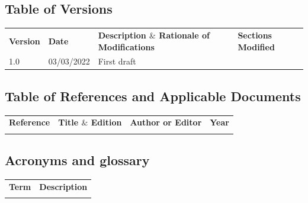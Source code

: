 \documentclass[a4paper,11pt]{article}
\begin{document}
\subsection{Table of Versions}

\begin{table}[H]
\large
\centering
\begin{adjustbox}{width=\textwidth}
\begin{tabular}{ |p{1.5cm}|p{2.5cm}|p{9.0cm}|p{3.0cm}| }
\hhline{----}
\textbf{Version} & \textbf{Date} & \textbf{Description  $  \&  $  Rationale of
Modifications} & \textbf{Sections Modified} \\
\hhline{----}
1.0 & 03/03/2022 & First draft &  \\ 
\hline
\end{tabular}
\end{adjustbox}
\end{table}

\subsection{Table of References and Applicable Documents}

\begin{table}[H]
\large
\centering
\begin{adjustbox}{width=\textwidth}
\begin{tabular}{ |p{2.66in}|p{2.66in}|p{0.95in}|p{0.43in}| }
\hhline{----}
\textbf{Reference} & \textbf{Title  $  \&  $  Edition} & \textbf{Author or
Editor} & \textbf{Year}
\\
\hhline{----}
 &  &  &  \\ 
\hline
\end{tabular}
\end{adjustbox}
\end{table}

\subsection{Acronyms and glossary}

\begin{table}[H]
\large
\centering
\begin{adjustbox}{width=\textwidth}
\begin{tabular}{ |p{1.24in}|p{5.45in}| }
\hhline{--}
\textbf{Term} & \textbf{Description} \\ 
\hhline{--}
 &  \\ 
\hline
\end{tabular}
\end{adjustbox}
\end{table}
\end{document}
